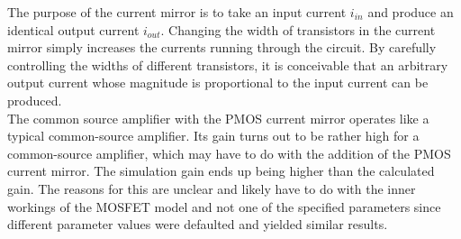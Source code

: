 The purpose of the current mirror is to take an input current $i_{in}$ and produce an identical output current $i_{out}$. Changing the width of transistors in the current mirror simply increases the currents running through the circuit. By carefully controlling the widths of different transistors, it is conceivable that an arbitrary output current whose magnitude is proportional to the input current can be produced. \\

The common source amplifier with the PMOS current mirror operates like a typical common-source amplifier. Its gain turns out to be rather high for a common-source amplifier, which may have to do with the addition of the PMOS current mirror. The simulation gain ends up being higher than the calculated gain. The reasons for this are unclear and likely have to do with the inner workings of the MOSFET model and not one of the specified parameters since different parameter values were defaulted and yielded similar results.
